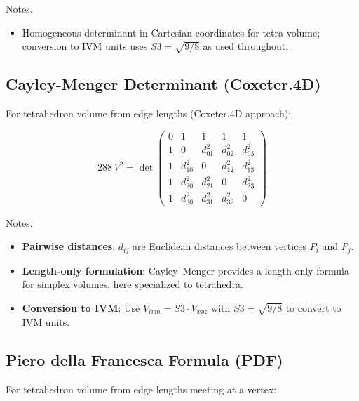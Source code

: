 \documentclass[
  10pt,
]{article}
\providecommand{\tightlist}{%
  \setlength{\itemsep}{0pt}\setlength{\parskip}{0pt}}
\begin{document}
Notes.

\begin{itemize}
\tightlist
\item
  Homogeneous determinant in Cartesian coordinates for tetra volume;
  conversion to IVM units uses \(S3=\sqrt{9/8}\) as used throughout.
\end{itemize}

\hypertarget{cayley-menger-determinant-coxeter.4d}{%
\subsection{Cayley-Menger Determinant
(Coxeter.4D)}\label{cayley-menger-determinant-coxeter.4d}}

For tetrahedron volume from edge lengths (Coxeter.4D approach):

\begin{equation}\label{eq:cayley_menger}
288\,V^2 = \det\begin{pmatrix}
  0 & 1 & 1 & 1 & 1 \\
  1 & 0 & d_{01}^2 & d_{02}^2 & d_{03}^2 \\
  1 & d_{10}^2 & 0 & d_{12}^2 & d_{13}^2 \\
  1 & d_{20}^2 & d_{21}^2 & 0 & d_{23}^2 \\
  1 & d_{30}^2 & d_{31}^2 & d_{32}^2 & 0
\end{pmatrix}
\end{equation}

Notes.

\begin{itemize}
\tightlist
\item
  \textbf{Pairwise distances}: \(d_{ij}\) are Euclidean distances
  between vertices \(P_i\) and \(P_j\).
\item
  \textbf{Length-only formulation}: Cayley--Menger provides a
  length-only formula for simplex volumes, here specialized to
  tetrahedra.
\item
  \textbf{Conversion to IVM}: Use \(V_{ivm} = S3 \cdot V_{xyz}\) with
  \(S3=\sqrt{9/8}\) to convert to IVM units.
\end{itemize}

\hypertarget{piero-della-francesca-formula-pdf}{%
\subsection{Piero della Francesca Formula
(PDF)}\label{piero-della-francesca-formula-pdf}}

For tetrahedron volume from edge lengths meeting at a vertex:
\end{document}
